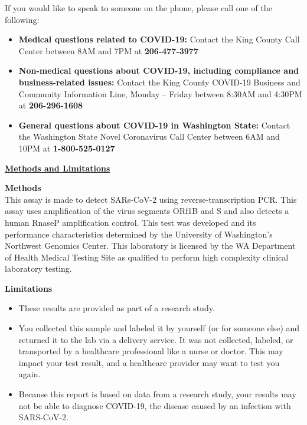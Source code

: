 \documentclass[10pt]{article}
\begin{document}
If you would like to speak to someone on the phone, please call one of the
following:

\begin{itemize}

\item

  \textbf{Medical questions related to COVID-19:} Contact the King County Call
  Center between 8AM and 7PM at \textbf{206-477-3977}

\item

  \textbf{Non-medical questions about COVID-19, including compliance and
  business-related issues:} Contact the King County COVID-19 Business and
  Community Information Line, Monday – Friday between 8:30AM and 4:30PM at
  \textbf{206-296-1608}

\item

  \textbf{General questions about COVID-19 in Washington State:} Contact the
  Washington State Novel Coronavirus Call Center between 6AM and 10PM at
  \textbf{1-800-525-0127}

\end{itemize}

\bigskip

\large \underline{\textbf{Methods and Limitations}}

\textbf{Methods}\\
This assay is made to detect SARs-CoV-2 using reverse-transcription PCR. This
assay uses amplification of the virus segments ORf1B and S and also detects a
human RnaseP amplification control. This test was developed and its performance
characteristics determined by the University of Washington’s Northwest Genomics
Center. This laboratory is licensed by the WA Department of Health Medical
Testing Site as qualified to perform high complexity clinical laboratory
testing.

\textbf{Limitations}

\begin{itemize}

\item

  These results are provided as part of a research study.

\item

  You collected this sample and labeled it by yourself (or for someone else) and
  returned it to the lab via a delivery service. It was not collected, labeled,
  or transported by a healthcare professional like a nurse or doctor. This may
  impact your test result, and a healthcare provider may want to test you again.

\item

  Because this report is based on data from a research study, your results may
  not be able to diagnose COVID-19, the disease caused by an infection with
  SARS-CoV-2.

\end{itemize}
\end{document}
